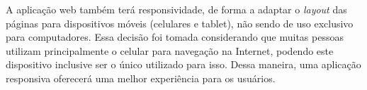 A aplicação web também terá responsividade, de forma a adaptar o \textit{layout} das páginas para dispositivos móveis (celulares e tablet), não sendo de uso exclusivo para computadores. Essa decisão foi tomada considerando que muitas pessoas utilizam principalmente o celular para navegação na Internet, podendo este dispositivo inclusive ser o único utilizado para isso. Dessa maneira, uma aplicação responsiva oferecerá uma melhor experiência para os usuários.